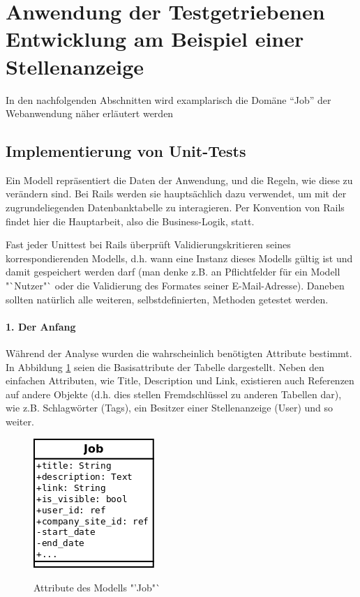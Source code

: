 \section{Anwendung der Testgetriebenen Entwicklung am Beispiel einer Stellenanzeige}
In den nachfolgenden Abschnitten wird examplarisch die Domäne "`Job"' der Webanwendung näher erläutert werden
    
    
\subsection{Implementierung von Unit-Tests}    

Ein Modell repräsentiert die Daten der Anwendung, und die Regeln, wie diese zu verändern sind. Bei Rails werden sie hauptsächlich dazu verwendet, um mit der zugrundeliegenden Datenbanktabelle zu interagieren. Per Konvention von Rails findet hier die Hauptarbeit, also die Business-Logik, statt.

Fast jeder Unittest bei Rails überprüft Validierungskritieren seines korrespondierenden Modells, d.h. wann eine Instanz dieses Modells gültig ist und damit gespeichert werden darf (man denke z.B. an Pflichtfelder für ein Modell "`Nutzer"` oder die Validierung des Formates seiner E-Mail-Adresse). Daneben sollten natürlich alle weiteren, selbstdefinierten, Methoden getestet werden.

\paragraph{1. Der Anfang}

Während der Analyse wurden die wahrscheinlich benötigten Attribute bestimmt. In Abbildung \ref{fig:job-erm} seien die Basisattribute der Tabelle dargestellt. Neben den einfachen Attributen, wie Title, Description und Link, existieren auch Referenzen auf andere Objekte (d.h. dies stellen Fremdschlüssel zu anderen Tabellen dar), wie z.B. Schlagwörter (Tags), ein Besitzer einer Stellenanzeige (User) und so weiter.

\begin{figure}[h]
 \centering
 \includegraphics{../diagrams/job-erm.png}
 \label{fig:job-erm}
 \caption{Attribute des Modells "'Job"`}
\end{figure}

